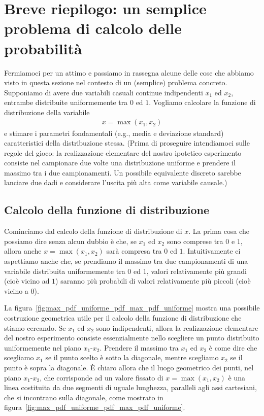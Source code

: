 \section{Breve riepilogo: un semplice problema di calcolo delle probabilità}

Fermiamoci per un attimo e passiamo in rassegna alcune delle cose che abbiamo
visto in questa sezione nel contesto di un (semplice) problema concreto.
Supponiamo di avere due variabili casuali continue indipendenti $x_1$ ed $x_2$,
entrambe distribuite uniformemente tra $0$ ed $1$. Vogliamo calcolare la
funzione di distribuzione della variabile
\begin{align*}
  x = \max(x_1, x_2)
\end{align*}
e stimare i parametri fondamentali (e.g., media e deviazione standard)
caratteristici della distribuzione stessa.
(Prima di proseguire intendiamoci sulle regole del gioco: la realizzazione
elementare del nostro ipotetico esperimento consiste nel campionare due volte
una distribuzione uniforme e prendere il massimo tra i due campionamenti.
Un possibile equivalente discreto sarebbe lanciare due dadi e considerare
l'uscita più alta come variabile causale.)


\subsection{Calcolo della funzione di distribuzione}

Cominciamo dal calcolo della funzione di distribuzione di $x$. La prima cosa che
possiamo dire senza alcun dubbio è che, se $x_1$ ed $x_2$ sono comprese tra
$0$ e $1$, allora anche $x = \max(x_1, x_2)$ sarà compresa tra $0$ ed $1$.
Intuitivamente ci aspettiamo anche che, se prendiamo il massimo tra due
campionamenti di una variabile distribuita uniformemente tra $0$ ed $1$, valori
relativamente più grandi (cioè vicino ad $1$) saranno più probabili
di valori relativamente più piccoli (cioè vicino a $0$).

La figura~\ref{fig:max_pdf_uniforme_pdf_max_pdf_uniforme} mostra una possibile
costruzione geometrica utile per il calcolo della funzione di distribuzione che
stiamo cercando. Se $x_1$ ed $x_2$ sono indipendenti, allora la realizzazione
elementare del nostro esperimento consiste essenzialmente nello scegliere un
punto distribuito uniformemente nel piano $x_1$-$x_2$. Prendere il massimo tra
$x_1$ ed $x_2$ è come dire che scegliamo $x_1$ se il punto scelto è sotto la
diagonale, mentre scegliamo $x_2$ se il punto è sopra la diagonale.
\`E chiaro allora che il luogo geometrico dei punti, nel piano $x_1$-$x_2$,
che corrisponde ad un valore fissato di $x = \max(x_1, x_2)$ è una linea
costituita da due segmenti di uguale lunghezza, paralleli agli assi cartesiani,
che si incontrano sulla diagonale, come mostrato in
figura~\ref{fig:max_pdf_uniforme_pdf_max_pdf_uniforme}.

